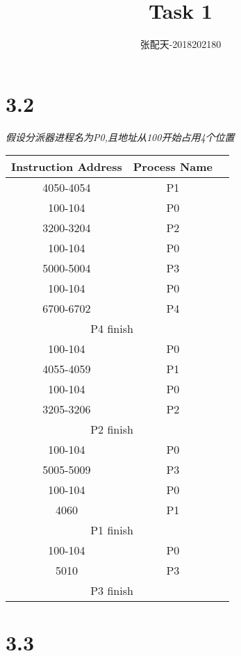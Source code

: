 \documentclass[UTF8]{ctexart}
\title{Task 1}
\author{张配天-2018202180}
\date{}
\begin{document}
    \maketitle
    \section*{3.2}
    \emph{假设分派器进程名为P0,且地址从100开始占用4个位置}
    \begin{table}[h]
    \centering
    \large
    \begin{tabular}{ccc}
        \hline
        Instruction Address & Process Name\\
        \hline
        4050-4054 & P1\\
        100-104 & P0\\
        3200-3204 & P2\\
        100-104 & P0\\
        5000-5004 & P3\\
        100-104 & P0\\
        6700-6702 & P4\\
        \hline
        \multicolumn{2}{c}{P4 \quad finish}\\
        \hline
        100-104 & P0\\
        4055-4059 &P1\\
        100-104 & P0\\
        3205-3206 & P2\\
        \hline
        \multicolumn{2}{c}{P2 \quad finish}\\
        \hline
        100-104 & P0\\
        5005-5009 & P3\\
        100-104 & P0\\
        4060 & P1\\
        \hline
        \multicolumn{2}{c}{P1 \quad finish}\\
        \hline
        100-104 & P0\\
        5010 & P3\\
        \hline
        \multicolumn{2}{c}{P3 \quad finish}\\
        \hline
    \end{tabular}
    \end{table}
    \clearpage
    \section*{3.3}
\end{document}
